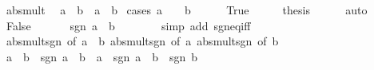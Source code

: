 \begin{isabellebody}
\endisatagproof
{\isafoldproof}%
%
\isadelimproof
\isanewline
%
\endisadelimproof
\isanewline
{}\isamarkupfalse%
\ abs{\isacharunderscore}{\kern0pt}mult{\isacharcolon}{\kern0pt}\isanewline
\ \ {\isachardoublequoteopen}{\isasymbar}a\ {\isacharasterisk}{\kern0pt}\ b{\isasymbar}\ {\isacharequal}{\kern0pt}\ {\isasymbar}a{\isasymbar}\ {\isacharasterisk}{\kern0pt}\ {\isasymbar}b{\isasymbar}{\isachardoublequoteclose}\isanewline
%
\isadelimproof
%
\endisadelimproof
%
\isatagproof
{}\isamarkupfalse%
\ {\isacharparenleft}{\kern0pt}cases\ {\isachardoublequoteopen}a\ {\isacharequal}{\kern0pt}\ {}\ {\isasymor}\ b\ {\isacharequal}{\kern0pt}\ {}{\isachardoublequoteclose}{\isacharparenright}{\kern0pt}\isanewline
\ \ \isamarkupfalse%
\ True\isanewline
\ \ \isamarkupfalse%
\ \isamarkupfalse%
\ {\isacharquery}{\kern0pt}thesis\isanewline
\ \ \ \ \isamarkupfalse%
\ auto\isanewline
{}\isamarkupfalse%
\isanewline
\ \ \isamarkupfalse%
\ False\isanewline
\ \ \isamarkupfalse%
\ \isamarkupfalse%
\ {\isacharasterisk}{\kern0pt}{\isacharcolon}{\kern0pt}\ {\isachardoublequoteopen}sgn\ {\isacharparenleft}{\kern0pt}a\ {\isacharasterisk}{\kern0pt}\ b{\isacharparenright}{\kern0pt}\ {\isasymnoteq}\ {}{\isachardoublequoteclose}\isanewline
\ \ \ \ \isamarkupfalse%
\ {\isacharparenleft}{\kern0pt}simp\ add{\isacharcolon}{\kern0pt}\ sgn{\isacharunderscore}{\kern0pt}eq{\isacharunderscore}{\kern0pt}{}{\isacharunderscore}{\kern0pt}iff{\isacharparenright}{\kern0pt}\isanewline
\ \ \isamarkupfalse%
\ abs{\isacharunderscore}{\kern0pt}mult{\isacharunderscore}{\kern0pt}sgn\ {\isacharbrackleft}{\kern0pt}of\ {\isachardoublequoteopen}a\ {\isacharasterisk}{\kern0pt}\ b{\isachardoublequoteclose}{\isacharbrackright}{\kern0pt}\ abs{\isacharunderscore}{\kern0pt}mult{\isacharunderscore}{\kern0pt}sgn\ {\isacharbrackleft}{\kern0pt}of\ a{\isacharbrackright}{\kern0pt}\ abs{\isacharunderscore}{\kern0pt}mult{\isacharunderscore}{\kern0pt}sgn\ {\isacharbrackleft}{\kern0pt}of\ b{\isacharbrackright}{\kern0pt}\isanewline
\ \ \isamarkupfalse%
\ {\isachardoublequoteopen}{\isasymbar}a\ {\isacharasterisk}{\kern0pt}\ b{\isasymbar}\ {\isacharasterisk}{\kern0pt}\ sgn\ {\isacharparenleft}{\kern0pt}a\ {\isacharasterisk}{\kern0pt}\ b{\isacharparenright}{\kern0pt}\ {\isacharequal}{\kern0pt}\ {\isasymbar}a{\isasymbar}\ {\isacharasterisk}{\kern0pt}\ sgn\ a\ {\isacharasterisk}{\kern0pt}\ {\isasymbar}b{\isasymbar}\ {\isacharasterisk}{\kern0pt}\ sgn\ b{\isachardoublequoteclose}\isanewline

\end{isabellebody}
